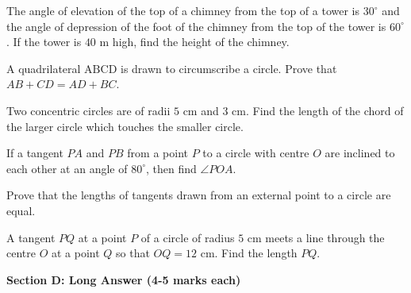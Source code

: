 \documentclass[12pt,a4paper]{exam}
\begin{document}
\begin{questions}
\question[3] The angle of elevation of the top of a chimney from the top of a tower is $30^\circ$ and the angle of depression of the foot of the chimney from the top of the tower is $60^\circ$. If the tower is $40$ m high, find the height of the chimney.
\vspace{0.15cm}

\question[3] A quadrilateral $\text{ABCD}$ is drawn to circumscribe a circle. Prove that $AB + CD = AD + BC$.
\vspace{0.15cm}

\question[3] Two concentric circles are of radii $5\text{ cm}$ and $3\text{ cm}$. Find the length of the chord of the larger circle which touches the smaller circle.
\vspace{0.15cm}

\question[3] If a tangent $PA$ and $PB$ from a point $P$ to a circle with centre $O$ are inclined to each other at an angle of $80^\circ$, then find $\angle POA$.
\vspace{0.15cm}

\question[3] Prove that the lengths of tangents drawn from an external point to a circle are equal.
\vspace{0.15cm}

\question[3] A tangent $PQ$ at a point $P$ of a circle of radius $5\text{ cm}$ meets a line through the centre $O$ at a point $Q$ so that $OQ = 12\text{ cm}$. Find the length $PQ$.
\vspace{0.15cm}

\end{questions}
\bigskip
\noindent\textbf{\large Section D: Long Answer (4-5 marks each)}
\end{document}
